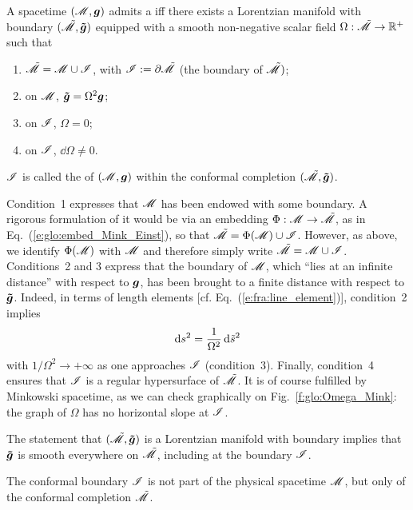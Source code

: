 \begin{greybox}
A spacetime $(\mathscr{M},\bm{g})$ admits a
iff there exists a Lorentzian manifold with boundary
$(\tilde{\mathscr{M}},\bm{\tilde{g}})$ equipped with a smooth non-negative scalar field
$\Omega: \tilde{\mathscr{M}} \rightarrow \mathbb{R}^+$
such that
\begin{enumerate}
\item $\tilde{\mathscr{M}} = \mathscr{M} \cup \mathscr{I}$, with $\mathscr{I} := \partial \tilde{\mathscr{M}}$
(the boundary of $\tilde{\mathscr{M}})$;
\item on $\mathscr{M}$, $\bm{\tilde{g}} = \Omega^2 \bm{g}$;
\item on $\mathscr{I}$, $\Omega=0$;
\item on $\mathscr{I}$, $\dd \Omega \not= 0$.
\end{enumerate}
$\mathscr{I}$ is called the 
of $(\mathscr{M},\bm{g})$ within
the conformal completion $(\tilde{\mathscr{M}},\bm{\tilde{g}})$.
\end{greybox}
Condition~1 expresses that $\mathscr{M}$ has been endowed with some boundary.
A rigorous formulation of it would be via an embedding $\Phi:\mathscr{M} \rightarrow \tilde{\mathscr{M}}$,
as in Eq.~(\ref{e:glo:embed_Mink_Einst}), so that
$\tilde{\mathscr{M}} = \Phi(\mathscr{M}) \cup \mathscr{I}$. However, as above, we identify $\Phi(\mathscr{M})$
with $\mathscr{M}$ and therefore simply write $\tilde{\mathscr{M}} = \mathscr{M} \cup \mathscr{I}$.
Conditions~2 and 3 express that the boundary of $\mathscr{M}$, which ``lies at an infinite
distance'' with respect to $\bm{g}$, has been brought to a
finite distance with respect to $\bm{\tilde{g}}$. Indeed, in terms of
length elements [cf. Eq.~(\ref{e:fra:line_element})], condition~2 implies
\[
    \mathrm{d} s^2 = \frac{1}{\Omega^2} \, \mathrm{d} {\tilde s}^2
\]
with $1/\Omega^2 \rightarrow +\infty$ as one approaches $\mathscr{I}$
(condition~3).
Finally, condition~4 ensures
that $\mathscr{I}$ is a regular hypersurface of $\tilde{\mathscr{M}}$.
It is of course fulfilled by Minkowski spacetime, as we can check graphically
on Fig.~\ref{f:glo:Omega_Mink}: the graph of $\Omega$ has no horizontal slope
at $\mathscr{I}$.

\begin{remark}
The statement that $(\tilde{\mathscr{M}},\bm{\tilde{g}})$ is a Lorentzian manifold with
boundary implies that $\bm{\tilde{g}}$ is smooth everywhere on $\tilde{\mathscr{M}}$,
including at the boundary $\mathscr{I}$.
\end{remark}

\begin{remark}
The conformal boundary $\mathscr{I}$ is not part of the physical spacetime
$\mathscr{M}$, but only of the conformal completion $\tilde{\mathscr{M}}$.
\end{remark}

